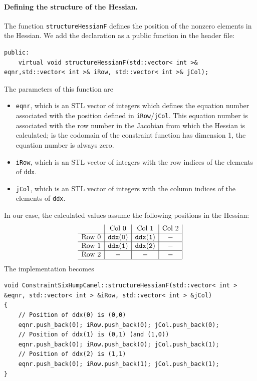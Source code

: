 \paragraph{Defining the structure of the Hessian.}
The function \texttt{structureHessianF} defines the position of the nonzero elements in the Hessian. We add the declaration as a public function in the header file:
\begin{lstlisting}
public:
	virtual void structureHessianF(std::vector< int >& eqnr,std::vector< int >& iRow, std::vector< int >& jCol);
\end{lstlisting}
The parameters of this function are
\begin{itemize}
\item
\texttt{eqnr}, which is an STL vector of integers which defines the equation number associated with the position defined in \texttt{iRow}/\texttt{jCol}. This equation number is associated with the row number in the Jacobian from which the Hessian is calculated; is the codomain of the constraint function has dimension 1, the equation number is always zero.
\item
\texttt{iRow}, which is an STL vector of integers with the row indices of the elements of \texttt{ddx}.
\item
\texttt{jCol}, which is an STL vector of integers with the column indices of the elements of \texttt{ddx}.
\end{itemize}
In our case, the calculated values assume the following positions in the Hessian:
\[
\begin{array}{l|c|c|c|}
& \mathrm{Col\ 0} & \mathrm{Col\ 1} & \mathrm{Col\ 2} \\
\hline
\mathrm{Row\ 0} & \mathtt{ddx(0)} & \mathtt{ddx(1)} & - \\
\hline
\mathrm{Row\ 1} & \mathtt{ddx(1)} & \mathtt{ddx(2)} & - \\
\hline
\mathrm{Row\ 2} & - & - & - \\
\hline
\end{array}
\]
The implementation becomes
\begin{lstlisting}
void ConstraintSixHumpCamel::structureHessianF(std::vector< int > &eqnr, std::vector< int > &iRow, std::vector< int > &jCol)
{
	// Position of ddx(0) is (0,0)
    eqnr.push_back(0); iRow.push_back(0); jCol.push_back(0);
    // Position of ddx(1) is (0,1) (and (1,0))
    eqnr.push_back(0); iRow.push_back(0); jCol.push_back(1);
    // Position of ddx(2) is (1,1)
    eqnr.push_back(0); iRow.push_back(1); jCol.push_back(1);
}
\end{lstlisting}

